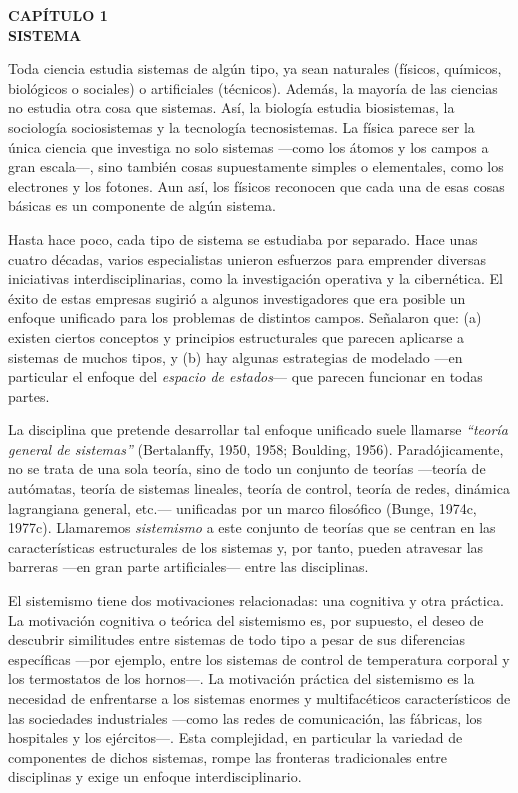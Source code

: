 \thispagestyle{plain}
\begin{center}
{\Large \textbf{CAPÍTULO 1}}\\[3\baselineskip]
{\LARGE \textbf{SISTEMA}}
\end{center}

\vspace{1cm}

\noindent
{\fontsize{14}{16}\selectfont
Toda ciencia estudia sistemas de algún tipo, ya sean naturales (físicos, químicos, biológicos o sociales) o artificiales (técnicos). Además, la mayoría de las ciencias no estudia otra cosa que sistemas. Así, la biología estudia biosistemas, la sociología sociosistemas y la tecnología tecnosistemas. La física parece ser la única ciencia que investiga no solo sistemas —como los átomos y los campos a gran escala—, sino también cosas supuestamente simples o elementales, como los electrones y los fotones. Aun así, los físicos reconocen que cada una de esas cosas básicas es un componente de algún sistema.

Hasta hace poco, cada tipo de sistema se estudiaba por separado. Hace unas cuatro décadas, varios especialistas unieron esfuerzos para emprender diversas iniciativas interdisciplinarias, como la investigación operativa y la cibernética.  
El éxito de estas empresas sugirió a algunos investigadores que era posible un enfoque unificado para los problemas de distintos campos. Señalaron que:  
(a) existen ciertos conceptos y principios estructurales que parecen aplicarse a sistemas de muchos tipos, y  
(b) hay algunas estrategias de modelado —en particular el enfoque del \textit{espacio de estados}— que parecen funcionar en todas partes.

La disciplina que pretende desarrollar tal enfoque unificado suele llamarse \textit{``teoría general de sistemas''} (Bertalanffy, 1950, 1958; Boulding, 1956). Paradójicamente, no se trata de una sola teoría, sino de todo un conjunto de teorías —teoría de autómatas, teoría de sistemas lineales, teoría de control, teoría de redes, dinámica lagrangiana general, etc.— unificadas por un marco filosófico (Bunge, 1974c, 1977c). Llamaremos \textit{sistemismo} a este conjunto de teorías que se centran en las características estructurales de los sistemas y, por tanto, pueden atravesar las barreras —en gran parte artificiales— entre las disciplinas.

El sistemismo tiene dos motivaciones relacionadas: una cognitiva y otra práctica.  
La motivación cognitiva o teórica del sistemismo es, por supuesto, el deseo de descubrir similitudes entre sistemas de todo tipo a pesar de sus diferencias específicas —por ejemplo, entre los sistemas de control de temperatura corporal y los termostatos de los hornos—.  
La motivación práctica del sistemismo es la necesidad de enfrentarse a los sistemas enormes y multifacéticos característicos de las sociedades industriales —como las redes de comunicación, las fábricas, los hospitales y los ejércitos—. Esta complejidad, en particular la variedad de componentes de dichos sistemas, rompe las fronteras tradicionales entre disciplinas y exige un enfoque interdisciplinario.
}

